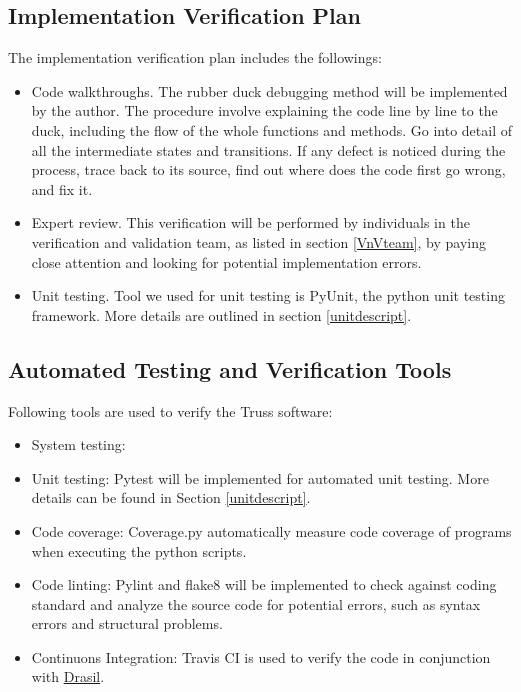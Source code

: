 \documentclass[12pt, titlepage]{article}
\begin{document}
\subsection{Implementation Verification Plan} \label{implplan}
The implementation verification plan includes the followings:
\begin{itemize}
	\item Code walkthroughs. The rubber duck debugging 
	\cite{Rubberduckdebugging} method will be implemented by the author. The 
	procedure involve explaining the code line by line to the duck, including 
	the flow of the whole functions and methods. Go into detail of all the 
	intermediate states and transitions. If any defect is noticed during the 
	process, trace	back to its source, find out where does the code first go 
	wrong, and fix it.  
	\item Expert review. This verification will be performed by individuals in 
	the verification and validation team, as listed in section \ref{VnVteam}, 
	by paying close attention and looking for potential implementation errors. 
	\item Unit testing. Tool we used for unit testing is PyUnit, the python 
	unit testing framework. More details are outlined in section 
	\ref{unitdescript}.
\end{itemize}

\subsection{Automated Testing and Verification Tools} \label{autotool}
Following tools are used to verify the Truss software:
\begin{itemize}
	\item System testing:
	\item Unit testing: Pytest will be implemented for automated unit testing. 
	More details can be found in Section \ref{unitdescript}.
	\item Code coverage: Coverage.py automatically measure code coverage of 
	programs when executing the python scripts.
	\item Code linting: Pylint and flake8 will be implemented to check against 
	coding standard and analyze the source code for potential errors, such as 
	syntax errors and structural problems.  
	\item Continuons Integration: Travis CI is used to verify the code in 
	conjunction with \href{https://github.com/JacquesCarette/Drasil}{Drasil}.
\end{itemize}
\end{document}
